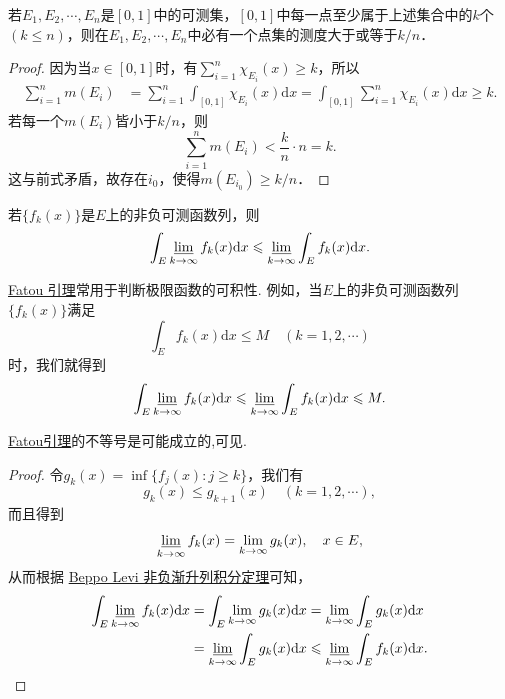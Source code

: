 \documentclass[../../main.tex]{subfiles}%
\begin{document}
\begin{example}
若\(E_1, E_2, \cdots, E_n\)是\([0, 1]\)中的可测集，\([0, 1]\)中每一点至少属于上述集合中的\(k\)个\((k \leqslant n)\)，则在\(E_1, E_2, \cdots, E_n\)中必有一个点集的测度大于或等于\(k / n\)．
\end{example}
\begin{proof}
因为当\(x \in [0, 1]\)时，有\(\sum_{i = 1}^{n} \chi_{E_i}(x) \geqslant k\)，所以
\begin{align*}
\sum_{i = 1}^{n} m(E_i) &= \sum_{i = 1}^{n} \int_{[0, 1]} \chi_{E_i}(x) \mathrm{d}x = \int_{[0, 1]} \sum_{i = 1}^{n} \chi_{E_i}(x) \mathrm{d}x \geqslant k.
\end{align*}
若每一个\(m(E_i)\)皆小于\(k / n\)，则
\[
\sum_{i = 1}^{n} m(E_i) < \frac{k}{n} \cdot n = k.
\]
这与前式矛盾，故存在\(i_0\)，使得\(m(E_{i_0}) \geqslant k / n\)． 
\end{proof}

\begin{theorem}[Fatou引理]\label{theorem:Fatou引理}
若\(\{f_k(x)\}\)是\(E\)上的非负可测函数列，则
\begin{align*}
\int_E \varliminf_{k \to \infty} f_k(x) \mathrm{d}x \leqslant \varliminf_{k \to \infty} \int_E f_k(x) \mathrm{d}x. 
\end{align*}
\end{theorem}
\begin{note}
\hyperref[theorem:Fatou引理]{Fatou 引理}常用于判断极限函数的可积性. 例如，当\(E\)上的非负可测函数列\(\{f_k(x)\}\)满足
\[
\int_E f_k(x) \mathrm{d}x \leqslant M \quad (k = 1, 2, \cdots)
\]
时，我们就得到
\[
\int_E \varliminf_{k \to \infty} f_k(x) \mathrm{d}x \leqslant \varliminf_{k \to \infty} \int_E f_k(x) \mathrm{d}x\leqslant M.
\] 
\end{note}
\begin{remark}
\hyperref[theorem:Fatou引理]{Fatou引理}的不等号是可能成立的,可见.
\end{remark}
\begin{proof}
令\(g_k(x) = \inf\{f_j(x): j \geqslant k\}\)，我们有
\[
g_k(x) \leqslant g_{k + 1}(x) \quad (k = 1, 2, \cdots),
\]
而且得到
\[
\varliminf_{k \to \infty} f_k(x) = \lim_{k \to \infty} g_k(x), \quad x \in E,
\]
从而根据 \hyperref[theorem:Beppo Levi非负渐升列积分定理]{Beppo Levi 非负渐升列积分定理}可知，
\begin{align*}
\int_E \varliminf_{k \to \infty} f_k(x) \mathrm{d}x &= \int_E \lim_{k \to \infty} g_k(x) \mathrm{d}x = \lim_{k \to \infty} \int_E g_k(x) \mathrm{d}x \\
&= \varliminf_{k \to \infty} \int_E g_k(x) \mathrm{d}x \leqslant \varliminf_{k \to \infty} \int_E f_k(x) \mathrm{d}x.
\end{align*}
\end{proof}
\end{document}
